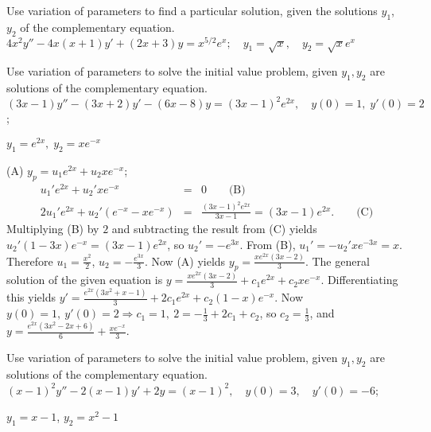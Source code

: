 \documentclass{ximera}
\begin{document}
\begin{problem}\label{exer:5.7.29}
Use variation
of parameters to find a particular solution, given the solutions
$y_1$, $y_2$ of the complementary equation. $4x^2y''-4x(x+1)y'+(2x+3)y=x^{5/2}e^x;   \quad
y_1=\sqrt x, \quad y_2=\sqrt xe^x$
\end{problem}


\begin{problem}\label{exer:5.7.30}
Use variation
of parameters to solve the initial value problem, given
$y_1,y_2$ are solutions of the complementary equation. $(3x-1)y''-(3x+2)y'-(6x-8)y=(3x-1)^2e^{2x}, \quad   y(0)=1,\;
y'(0)=2$;

$y_1=e^{2x},\;  y_2=xe^{-x}$

\begin{solution}
    (A) $y_p=u_1e^{2x}+u_2xe^{-x}$;
\setcounter{equation}{1}
\begin{eqnarray*}
u_1'e^{2x}+u_2'xe^{-x}&=&0\qquad\text{(B)}\\ %
2u_1'e^{2x}+u_2'(e^{-x}-xe^{-x})&=&\frac{(3x-1)^2e^{2x}}{
3x-1}=(3x-1)e^{2x}.\qquad\text{(C)} %
\end{eqnarray*}
Multiplying (B) by $2$ and subtracting the result
from (C) yields $u_2'(1-3x)e^{-x}=(3x-1)e^{2x}$, so
$u_2'=-e^{3x}$. From (B), $u_1'=-u_2'xe^{-3x}=x$.
Therefore $u_1=\frac{x^2}{2}$, $u_2=-\frac{e^{3x}}{3}$. Now (A)
yields $y_p=\frac{xe^{2x}(3x-2)}{3}$. The general solution of the
given equation is $y=\frac{xe^{2x}(3x-2)}{3}+c_1e^{2x}+c_2xe^{-x}$.
Differentiating this yields
$y'=\frac{e^{2x}(3x^2+x-1)}{3}+2c_1e^{2x}+c_2(1-x)e^{-x}$. Now
$y(0)=1,\ y'(0)=2\Rightarrow c_1=1,\ 2=-\frac{1}{3} +2c_1+c_2$, so
$c_2=\frac{1}{3}$, and
$y=\frac{e^{2x}(3x^2-2x+6)}{6}+\frac{xe^{-x}}{3}$.
\end{solution}
\end{problem}

\begin{problem}\label{exer:5.7.31}
Use variation
of parameters to solve the initial value problem, given
$y_1,y_2$ are solutions of the complementary equation. $(x-1)^2y''-2(x-1)y'+2y=(x-1)^2, \quad   y(0)=3,\quad   y'(0)=-6$;

$y_1=x-1$,\;
$y_2=x^2-1$
\end{problem}
\end{document}
